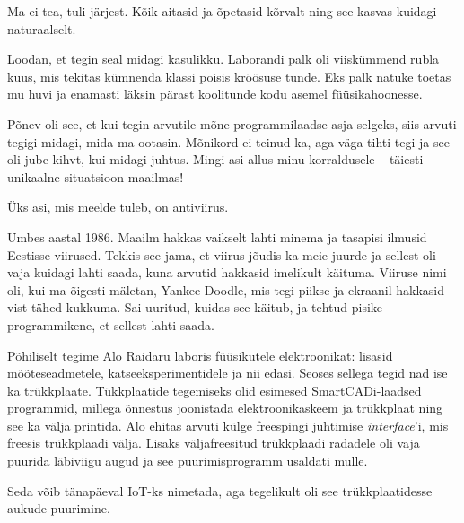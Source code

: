 
Ma ei tea, tuli järjest. Kõik aitasid ja õpetasid kõrvalt ning see kasvas kuidagi 
naturaalselt.

Loodan, et tegin seal midagi kasulikku. Laborandi palk oli viiskümmend 
rubla kuus, mis tekitas kümnenda klassi poisis kröösuse tunde. Eks 
palk natuke toetas mu huvi ja 
enamasti läksin pärast koolitunde kodu asemel füüsikahoonesse.


Põnev oli see, et kui tegin arvutile mõne programmilaadse asja 
selgeks, siis arvuti tegigi midagi, mida ma ootasin. 
Mõnikord ei teinud ka, aga väga tihti tegi ja see oli jube kihvt, kui midagi 
juhtus. Mingi asi allus minu korraldusele -- täiesti unikaalne situatsioon 
maailmas!


Üks asi, mis meelde tuleb, on antiviirus. 


Umbes aastal 1986. Maailm hakkas vaikselt lahti minema ja 
tasapisi ilmusid Eestisse viirused. Tekkis see jama, et viirus jõudis ka
meie juurde ja sellest oli vaja kuidagi lahti saada, kuna arvutid hakkasid 
imelikult käituma. Viiruse nimi oli, kui ma õigesti mäletan, Yankee 
Doodle, mis tegi piikse ja ekraanil 
hakkasid vist tähed kukkuma. Sai uuritud, kuidas see käitub, ja tehtud pisike 
programmikene, et sellest lahti saada.

Põhiliselt tegime Alo Raidaru laboris füüsikutele
elektroonikat: lisasid mõõteseadmetele, 
katseeksperimentidele ja nii edasi. Seoses sellega tegid nad ise ka trükkplaate. 
Tükkplaatide tegemiseks olid esimesed SmartCADi-laadsed programmid, millega 
õnnestus joonistada elektroonikaskeem ja trükkplaat ning see ka välja 
printida. Alo ehitas arvuti külge freespingi juhtimise \emph{interface}'i, mis 
freesis trükkplaadi välja. Lisaks väljafreesitud trükkplaadi 
radadele oli vaja puurida läbiviigu augud ja see 
puurimisprogramm usaldati mulle.


Seda võib tänapäeval IoT-ks nimetada, aga tegelikult oli see trükkplaatidesse 
aukude puurimine. 

